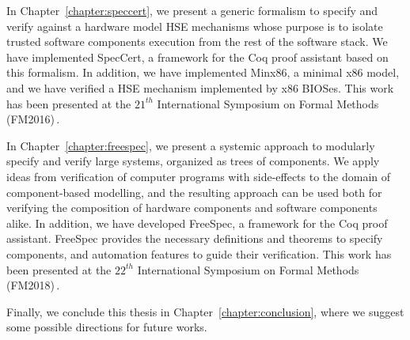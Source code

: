 In Chapter~\ref{chapter:speccert}, we present a generic formalism to specify and
verify against a hardware model HSE mechanisms whose purpose is to isolate
trusted software components execution from the rest of the software stack.
%
We have implemented SpecCert, a framework for the Coq proof assistant based on
this formalism. In addition, we have implemented {\sc Minx86}, a minimal x86
model, and we have verified a HSE mechanism implemented by x86 BIOSes.
%
This work has been presented at the $21^{th}$ International Symposium on Formal
Methods (FM2016)\,\cite{letan2016speccert}.

In Chapter~\ref{chapter:freespec}, we present a systemic approach to modularly
specify and verify large systems, organized as trees of components.
%
We apply ideas from verification of computer programs with side-effects to the
domain of component-based modelling, and the resulting approach can be used both
for verifying the composition of hardware components and software components
alike.
%
In addition, we have developed FreeSpec, a framework for the Coq proof
assistant.
%
FreeSpec provides the necessary definitions and theorems to specify components,
and automation features to guide their verification.
%
This work has been presented at the $22^{th}$ International Symposium on Formal
Methods (FM2018)\,\cite{letan2018freespec}.

Finally, we conclude this thesis in Chapter~\ref{chapter:conclusion}, where we
suggest some possible directions for future works.
